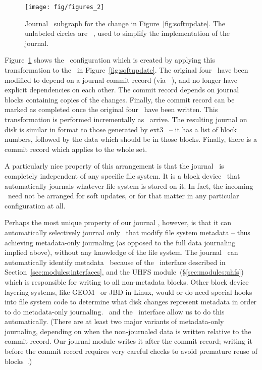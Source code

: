 \begin{figure}
  \centering
  \texttt{[image: fig/figures\_2]}
  \caption{\label{fig:journal} Journal \chdesc\ subgraph for the
    change in Figure~\ref{fig:softupdate}. The unlabeled circles are
    \noop\ \chdescs, used to simplify the implementation of the journal.}
\end{figure}

Figure~\ref{fig:journal} shows the \chdesc\ configuration which is created by
applying this transformation to the \chdescs\ in Figure~\ref{fig:softupdate}.
The original four \chdescs\ have been modified to depend on a journal commit
record (via \anoop\ \chdesc), and no longer have explicit dependencies on each
other. The commit record depends on journal blocks containing copies of the
changes. Finally, the commit record can be marked as completed once the
original four \chdescs\ have been written. This transformation is performed
incrementally as \chdescs\ arrive. The resulting journal on disk is similar in
format to those generated by ext3~\cite{tweedie98journaling} -- it has a list of
block numbers, followed by the data which should be in those blocks. Finally,
there is a commit record which applies to the whole set.

A particularly nice property of this arrangement is that the journal \module\ is
completely independent of any specific file system. It is a block device
\module\ that automatically journals whatever file system is stored on it. In
fact, the incoming \chdescs\ need not be arranged for soft updates, or for that
matter in any particular configuration at all.

Perhaps the most unique property of our journal \module, however, is that it can
automatically selectively journal only \chdescs\ that modify file system
metadata -- thus achieving metadata-only journaling (as opposed to the full data
journaling implied above), without any knowledge of the file system.
%
The journal \module\ can automatically identify metadata \chdescs\ because of
the \LFS\ interface described in Section~\ref{sec:modules:interfaces}, and the
UHFS module~(\S\ref{sec:modules:uhfs}) which is responsible for writing to all
non-metadata blocks. Other block device layering systems, like GEOM~\cite{geom}
or JBD in Linux, would or do need special hooks into file system code to
determine what disk changes represent metadata in order to do metadata-only
journaling. \Chdescs\ and the \LFS\ interface allow us to do this automatically.
%
(There are at least two major variants of metadata-only journaling, depending on
when the non-journaled data is written relative to the commit record. Our
journal module writes it after the commit record; writing it before the commit
record requires very careful checks to avoid premature reuse of
blocks~\cite{tweedie00ext3}.)

